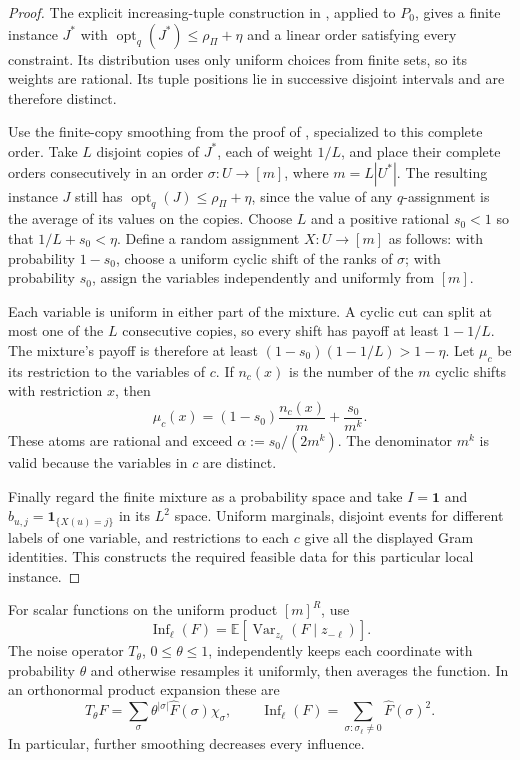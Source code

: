 \begin{proof}
The explicit increasing-tuple construction in
\cite[Theorem~11.1, Definition~11.2, and the proof of
Theorem~2.5]{GuruswamiEtAl2011OrderingCSP}, applied to \(P_0\),
gives a finite instance \(J^*\) with
\(\operatorname{opt}_q(J^*)\le\rho_\Pi+\eta\) and a linear order
satisfying every constraint.  Its distribution uses only uniform
choices from finite sets, so its weights are rational.  Its tuple
positions lie in successive disjoint intervals and are therefore
distinct.

Use the finite-copy smoothing from the proof of
\cite[Lemma~8.9]{GuruswamiEtAl2011OrderingCSP}, specialized to this
complete order.  Take \(L\) disjoint copies of \(J^*\), each of weight
\(1/L\), and place their complete orders consecutively in an order
\(\sigma:U\to[m]\), where \(m=L|U^*|\).  The resulting instance \(J\)
still has \(\operatorname{opt}_q(J)\le\rho_\Pi+\eta\), since the value
of any \(q\)-assignment is the average of its values on the copies.
Choose \(L\) and a positive rational \(s_0<1\) so that
\(1/L+s_0<\eta\).  Define a random assignment \(X:U\to[m]\) as
follows: with probability \(1-s_0\), choose a uniform cyclic shift
of the ranks of \(\sigma\); with probability \(s_0\), assign the
variables independently and uniformly from \([m]\).

Each variable is uniform in either part of the mixture.  A cyclic
cut can split at most one of the \(L\) consecutive copies, so every
shift has payoff at least \(1-1/L\).  The mixture's payoff is
therefore at least
\((1-s_0)(1-1/L)>1-\eta\).  Let \(\mu_c\) be its restriction to the
variables of \(c\).  If \(n_c(x)\) is the number of the \(m\) cyclic
shifts with restriction \(x\), then
\[
 \mu_c(x)=(1-s_0)\frac{n_c(x)}m+\frac{s_0}{m^k}.
\]
These atoms are rational and exceed
\(\alpha:=s_0/(2m^k)\).  The denominator \(m^k\) is valid because
the variables in \(c\) are distinct.

Finally regard the finite mixture as a probability space and take
\(I=\mathbf1\) and \(b_{u,j}=\mathbf1_{\{X(u)=j\}}\) in its
\(L^2\) space.  Uniform marginals, disjoint events for different
labels of one variable, and restrictions to each \(c\) give all the
displayed Gram identities.  This constructs the required feasible
data for this particular local instance.
\end{proof}

For scalar functions on the uniform product \([m]^R\), use
\[
 \operatorname{Inf}_\ell(F)
 =\mathbb E\!\left[\operatorname{Var}_{z_\ell}
       (F\mid z_{-\ell})\right].
\]
The noise operator \(T_\theta\), \(0\le\theta\le1\), independently
keeps each coordinate with probability \(\theta\) and otherwise
resamples it uniformly, then averages the function.  In an orthonormal
product expansion these are
\begin{equation}
 T_\theta F=\sum_\sigma\theta^{|\sigma|}\widehat F(\sigma)\chi_\sigma,
 \qquad
 \operatorname{Inf}_\ell(F)
 =\sum_{\sigma:\sigma_\ell\ne0}\widehat F(\sigma)^2.
\label{eq:ordering-noise-influence}
\end{equation}
In particular, further smoothing decreases every influence.

